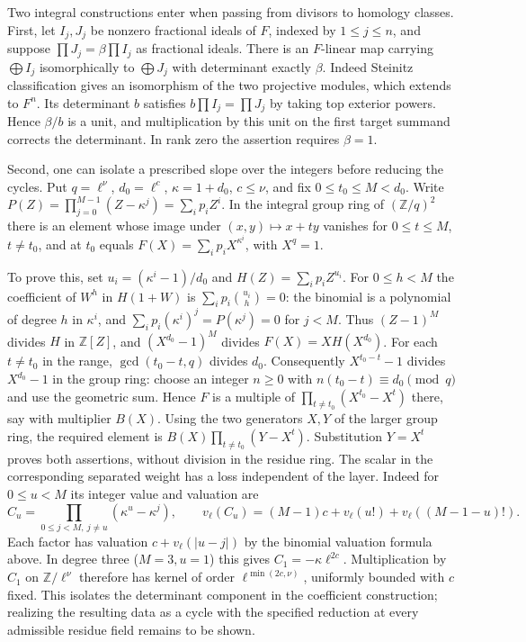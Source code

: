 \documentclass[11pt]{amsart}
\theoremstyle{definition}
\theoremstyle{remark}
\begin{document}
Two integral constructions enter when passing from divisors to
homology classes. First, let $I_j,J_j$ be nonzero fractional ideals
of $F$, indexed by $1\le j\le n$, and suppose
$\prod J_j=\beta\prod I_j$ as fractional ideals. There is an
$F$-linear map carrying $\bigoplus I_j$ isomorphically to
$\bigoplus J_j$ with determinant exactly $\beta$. Indeed Steinitz
classification gives an isomorphism of the two projective modules,
which extends to $F^n$. Its determinant $b$ satisfies
$b\prod I_j=\prod J_j$ by taking top exterior powers. Hence
$\beta/b$ is a unit, and multiplication by this unit on the first
target summand corrects the determinant. In rank zero the assertion
requires $\beta=1$.

Second, one can isolate a prescribed slope over the integers before
reducing the cycles. Put $q=\ell^\nu$, $d_0=\ell^c$,
$\kappa=1+d_0$, $c\le\nu$, and fix $0\le t_0\le M<d_0$. Write
$P(Z)=\prod_{j=0}^{M-1}(Z-\kappa^j)=\sum_i p_i Z^i$.
In the integral group ring of $(\mathbb Z/q)^2$ there is an element
whose image under $(x,y)\mapsto x+ty$ vanishes for
$0\le t\le M$, $t\ne t_0$, and at $t_0$ equals
$F(X)=\sum_i p_iX^{\kappa^i}$, with $X^q=1$.

To prove this, set $u_i=(\kappa^i-1)/d_0$ and
$H(Z)=\sum_i p_iZ^{u_i}$. For $0\le h<M$ the coefficient of $W^h$
in $H(1+W)$ is $\sum_i p_i\binom{u_i}{h}=0$: the binomial is a
polynomial of degree $h$ in $\kappa^i$, and
$\sum_i p_i(\kappa^i)^j=P(\kappa^j)=0$ for $j<M$.
Thus $(Z-1)^M$ divides $H$ in $\mathbb Z[Z]$, and
$(X^{d_0}-1)^M$ divides $F(X)=XH(X^{d_0})$. For each
$t\ne t_0$ in the range, $\gcd(t_0-t,q)$ divides $d_0$.
Consequently $X^{t_0-t}-1$ divides $X^{d_0}-1$ in the group ring:
choose an integer $n\ge0$ with $n(t_0-t)\equiv d_0\pmod q$
and use the geometric sum. Hence $F$ is a multiple of
$\prod_{t\ne t_0}(X^{t_0}-X^t)$ there, say with multiplier $B(X)$.
Using the two generators $X,Y$ of the larger group ring, the required
element is $B(X)\prod_{t\ne t_0}(Y-X^t)$. Substitution $Y=X^t$
proves both assertions, without division in the residue ring.
The scalar in the corresponding separated weight
has a loss independent of the layer. Indeed for $0\le u<M$ its
integer value and valuation are
\[
 C_u=\prod_{0\le j<M,\ j\ne u}(\kappa^u-\kappa^j),\qquad
 v_\ell(C_u)=(M-1)c+v_\ell(u!)+v_\ell((M-1-u)!).
\]
Each factor has valuation $c+v_\ell(|u-j|)$ by the binomial
valuation formula above. In degree three ($M=3,u=1$) this gives
$C_1=-\kappa\ell^{2c}$. Multiplication by $C_1$ on
$\mathbb Z/\ell^\nu$ therefore has kernel of order
$\ell^{\min(2c,\nu)}$, uniformly bounded with $c$ fixed.
This isolates the determinant component in the coefficient construction;
realizing the resulting data as a cycle with the specified reduction
at every admissible residue field remains to be shown.
\end{document}
